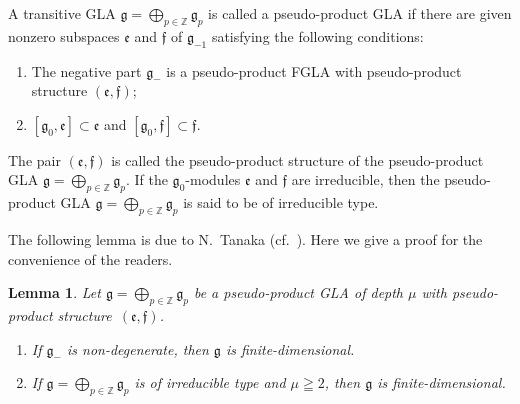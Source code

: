 \documentclass[11pt]{article}
\newtheorem{lemma}{Lemma}
\numberwithin{equation}{section}
\numberwithin{theorem}{section}
\numberwithin{proposition}{section}
\numberwithin{lemma}{section}
\numberwithin{corollary}{section}
\numberwithin{definition}{section}
\numberwithin{example}{section}
\numberwithin{remark}{section}
\numberwithin{note}{section}
\newcommand{\gla}[1]{\mathfrak#1=\bigoplus\limits_{p\in\mathbb Z}\mathfrak#1_p} \renewcommand{\labelenumi}{{\rm (\arabic{enumi})}}
\begin{document}
A transitive GLA $\gla g$ is called a pseudo-product GLA
if there are given nonzero subspaces $\mathfrak e$ and $\mathfrak f$ of $\mathfrak g_{-1}$ satisfying the following conditions:
\begin{enumerate}\itemsep=0pt
\renewcommand{\labelenumi}{$(\roman{enumi})$}
\item The negative part $\mathfrak g_{-}$ is
a pseudo-product
FGLA with pseudo-product structure
$(\mathfrak e,\mathfrak f)$;
\item $[\mathfrak g_0,\mathfrak e]\subset \mathfrak e$
and $[\mathfrak g_0,\mathfrak f]\subset \mathfrak f$.
\end{enumerate}
The pair $(\mathfrak e,\mathfrak f)$ is called the pseudo-product structure of
 the pseudo-product GLA
$\gla g$.
If the $\mathfrak g_0$-modules $\mathfrak e$ and $\mathfrak f$ are
irreducible,
then the pseudo-product GLA $\gla g$ is said to be
of irreducible type.

The following lemma is due to N.~Tanaka (cf.~\cite{tan89:01}).
Here we give a proof for the convenience of the readers.
\begin{lemma}\label{lemma8.1} Let $\gla g$ be a pseudo-product GLA of
depth $\mu$ with pseudo-product structure~$(\mathfrak e,\mathfrak f)$.
\begin{enumerate}\itemsep=0pt
\item If $\mathfrak g_-$ is non-degenerate,
then $\mathfrak g$ is finite-dimensional.
\item If $\gla g$ is of irreducible type and $\mu\geqq2$, then
$\mathfrak g$ is finite-dimensional.
\end{enumerate}
\end{lemma}
\end{document}
